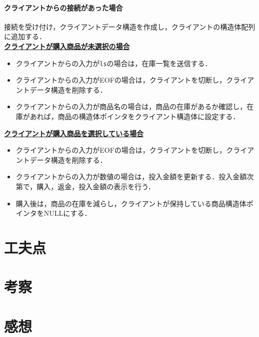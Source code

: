 \documentclass[12pt,dvipdfmx]{jlreq}
\begin{document}
\paragraph{クライアントからの接続があった場合}接続を受け付け，クライアントデータ構造を作成し，クライアントの構造体配列に追加する．\\
\textbf{\underline{クライアントが購入商品が未選択の場合}}
\begin{itemize}
    \item クライアントからの入力が\texttt{ls}の場合は，在庫一覧を送信する．
    \item クライアントからの入力がEOFの場合は，クライアントを切断し，クライアントデータ構造を削除する．
    \item クライアントからの入力が商品名の場合は，商品の在庫があるか確認し，在庫があれば，商品の構造体ポインタをクライアント構造体に設定する．
\end{itemize}
\textbf{\underline{クライアントが購入商品を選択している場合}}
\begin{itemize}
    \item クライアントからの入力がEOFの場合は，クライアントを切断し，クライアントデータ構造を削除する．
    \item クライアントからの入力が数値の場合は，投入金額を更新する．投入金額次第で，購入，返金，投入金額の表示を行う．
    \item 購入後は，商品の在庫を減らし，クライアントが保持している商品構造体ポインタをNULLにする．
\end{itemize}
\section*{工夫点}
\section*{考察}
\section*{感想}
\end{document}
